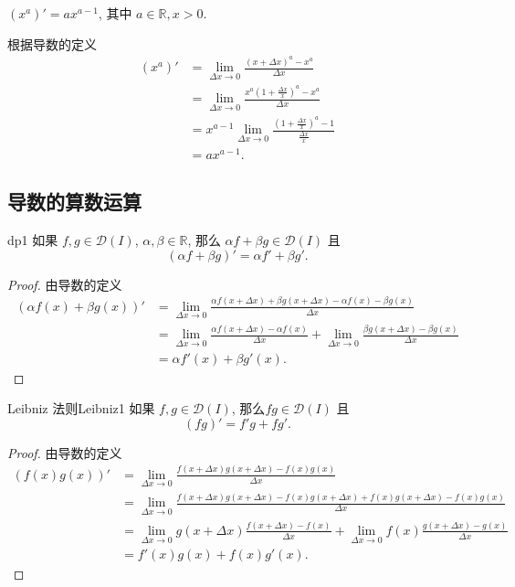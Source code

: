 \documentclass[cn,toc=twocol]{elegantbook}
\newcommand{\R}{\mathbb{R}}
\newcommand{\D}{\mathscr{D}}
\begin{document}
\vspace{0.8em}

\begin{example}
	$(x^a)' = a x^{a - 1}$, 其中 $a \in \R, x > 0$.
\end{example}
\begin{solution}
	根据导数的定义
	\[
	\begin{aligned}
		(x^a)' &= \lim_{\Delta x \to 0} \frac{(x + \Delta x)^a - x^a}{\Delta x}\\
		&= \lim_{\Delta x \to 0} \frac{x^a(1 + \frac{\Delta x}{x})^a - x^a}{\Delta x}\\
		&= x^{a - 1}\lim_{\Delta x \to 0} \frac{(1 + \frac{\Delta x}{x})^a - 1}{\frac{\Delta x}{x}}\\
		&= a x^{a -1}.
	\end{aligned}
	\]
\end{solution}

\subsection{导数的算数运算}

\begin{theorem}{}{dp1}
	如果 $f,g \in \D(I)$, $\alpha,\beta\in\R$, 那么 $\alpha f + \beta g \in \D(I)$ 且
	\[
		(\alpha f + \beta g)' = \alpha f' + \beta g'.
	\]
\end{theorem}
\begin{proof}
	由导数的定义
	\[
	\begin{aligned}
		(\alpha f(x) + \beta g(x))' &= \lim_{\Delta x \to 0}\frac{\alpha f(x + \Delta x) + \beta g(x + \Delta x) - \alpha f(x) - \beta g(x)}{\Delta x}\\
		&= \lim_{\Delta x \to 0}\frac{\alpha f(x + \Delta x) - \alpha f(x)}{\Delta x} + \lim_{\Delta x \to 0}\frac{\beta g(x + \Delta x)- \beta g(x)}{\Delta x}\\
		&= \alpha f'(x) + \beta g'(x).
	\end{aligned}
	\]
\end{proof}


\begin{theorem}{Leibniz 法则}{Leibniz1}
	如果 $f,g \in \D(I)$, 那么$fg \in \D(I)$ 且
	\[
		(fg)' = f'g + fg'.
	\]
\end{theorem}
\begin{proof}
	由导数的定义
	\[
	\begin{aligned}
		(f(x) g(x))' &= \lim_{\Delta x \to 0}\frac{f(x + \Delta x)g(x + \Delta x) - f(x)g(x)}{\Delta x}\\
		&= \lim_{\Delta x \to 0}\frac{f(x + \Delta x)g(x + \Delta x) - f(x)g(x + \Delta x) + f(x)g(x + \Delta x) - f(x)g(x)}{\Delta x}\\
		&= \lim_{\Delta x \to 0} g(x + \Delta x) \frac{f(x + \Delta x) - f(x)}{\Delta x} + \lim_{\Delta x \to 0} f(x) \frac{ g(x + \Delta x)- g(x)}{\Delta x}\\
		&= f'(x)g(x) + f(x)g'(x).
	\end{aligned}
	\]
\end{proof}
\end{document}
